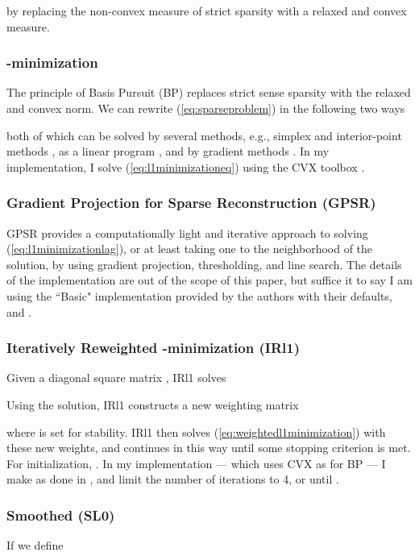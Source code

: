 \documentclass[11pt,draftcls,onecolumn]{IEEEtran}
\begin{document}
by replacing the non-convex measure of strict sparsity 
with a relaxed and convex measure.

\subsubsection{-minimization \cite{Chen1998}} 
The principle of Basis Pursuit (BP) replaces strict sense sparsity
 with the relaxed and convex  norm.
We can rewrite (\ref{eq:sparseproblem}) in the following two ways

both of which can be solved by several methods,
e.g., simplex and interior-point methods \cite{Boyd2004},
as a linear program \cite{Chen1998},
and by gradient methods \cite{Figueiredo2007}.
In my implementation, I solve (\ref{eq:l1minimizationeq}) 
using the CVX toolbox \cite{Grant2011}.

\subsubsection{Gradient Projection for Sparse Reconstruction (GPSR) \cite{Figueiredo2007}}
GPSR provides a computationally light and iterative approach to solving
(\ref{eq:l1minimizationlag}), or at least taking one to the neighborhood of the solution,
by using gradient projection, thresholding, and line search.
The details of the implementation are out of the scope of this paper,
but suffice it to say I am using the ``Basic" implementation
provided by the authors \cite{Figueiredo2007} with their defaults,
and .

\subsubsection{Iteratively Reweighted -minimization (IRl1) \cite{Candes2008b}}
Given a diagonal  square matrix ,
IRl1 solves

Using the solution, IRl1 constructs a new weighting matrix

where  is set for stability.
IRl1 then solves (\ref{eq:weightedl1minimization}) with these new weights,
and continues in this way until some stopping criterion is met.
For initialization, .
In my implementation --- which uses CVX as for BP ---
I make  as done in \cite{Candes2008b},
and limit the number of iterations to 4, or until .

\subsubsection{Smoothed  (SL0) \cite{Mohimani2009}}
If we define
\end{document}

